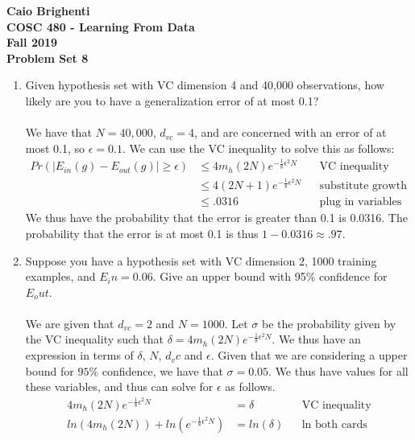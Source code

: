 \documentclass{article}
\begin{document}
\noindent \textbf{Caio Brighenti }\\
\noindent \textbf{COSC 480 - Learning From Data}\\%
\noindent \textbf{Fall 2019}\\%
\noindent \textbf{Problem Set 8}\vspace{1em}\\
\begin{enumerate}
	\item Given hypothesis set with VC dimension 4 and 40,000 observations, how likely are you to have a generalization error of at most 0.1?	
	\\\\ We have that $N=40,000$, $d_{vc}=4$, and are concerned with an error of at most 0.1, so $\epsilon = 0.1$. We can use the VC inequality to solve this as follows:
	\begin{align}
	Pr(|E_{in}(g)-E_{out}(g)|\geq \epsilon) &\leq 4m_h(2N)e^{-\frac{1}{8}\epsilon^2N} && \text{VC inequality} \\
	& \leq 4(2N+1)e^{-\frac{1}{8}\epsilon^2N} && \text{substitute growth function} \\
	&\leq .0316 && \text{plug in variables and calculate} 
	\end{align}
	We thus have the probability that the error is greater than 0.1 is 0.0316. The probability that the error is at most 0.1 is thus $1-0.0316\approx .97$.
	\item Suppose you have a hypothesis set with VC dimension 2, 1000 training examples, and $E_in=0.06$. Give an upper bound with 95\% confidence for $E_out$.
	\\\\ We are given that $d_{vc}=2$ and $N=1000$. Let $\sigma$ be the probability given by the VC inequality such that $\delta=4m_h(2N)e^{-\frac{1}{8}\epsilon^2N}$. We thus have an expression in terms of $\delta$, $N$, $d_vc$ and $\epsilon$. Given that we are considering a upper bound for $95\%$ confidence, we have that $\sigma = 0.05$. We thus have values for all these variables, and thus can solve for $\epsilon$ as follows.
	\begin{align}
	4m_h(2N)e^{-\frac{1}{8}\epsilon^2N} &= \delta && \text{VC inequality} \\
	ln(4m_h(2N))+ln(e^{-\frac{1}{8}\epsilon^2N}) &= ln(\delta) && \text{ln both cards} \\

\end{align}
\end{enumerate}
\end{document}
